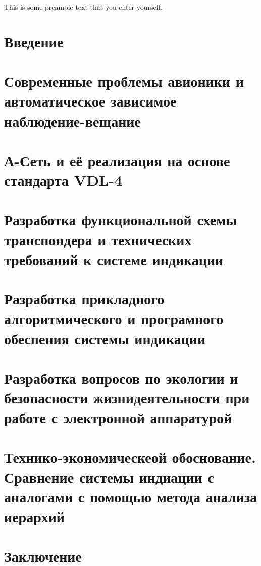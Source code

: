 \documentclass{article}
\begin{document}
\tableofcontents
This is some  preamble  text  that  you  enter  yourself.
\section{Введение} %
\lipsum [1]
\section{Современные проблемы авионики и автоматическое зависимое
  наблюдение-вещание} %
\lipsum [2-3]
\section{А-Сеть и её реализация на основе стандарта VDL-4} %
\lipsum [4-5]
\section{Разработка функциональной схемы транспондера и технических требований к
  системе индикации} %
\lipsum [6]
\section{Разработка прикладного алгоритмического и програмного обеспения
  системы индикации} %
\lipsum [7]
\section{Разработка вопросов по экологии и безопасности жизнидеятельности при
  работе с электронной аппаратурой} %
\lipsum [1]
\section{Технико-экономическеой обоснование. Сравнение системы индиации с
  аналогами с помощью метода анализа иерархий} %
\lipsum [1]
\section{Заключение}
\end{document}
